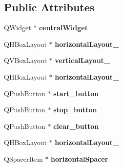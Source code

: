 \subsection*{Public Attributes}
\begin{DoxyCompactItemize}
\item 
Q\+Widget $\ast$ {\bfseries central\+Widget}\hypertarget{class_ui___main_window_a30075506c2116c3ed4ff25e07ae75f81}{}\label{class_ui___main_window_a30075506c2116c3ed4ff25e07ae75f81}

\item 
Q\+H\+Box\+Layout $\ast$ {\bfseries horizontal\+Layout\+\_}\hypertarget{class_ui___main_window_a2afb915e1492b7e6704db4918c1e5e80}{}\label{class_ui___main_window_a2afb915e1492b7e6704db4918c1e5e80}

\item 
Q\+V\+Box\+Layout $\ast$ {\bfseries vertical\+Layout\+\_}\hypertarget{class_ui___main_window_a38b8a4b887f3b58e2a49e7905ae6f1f0}{}\label{class_ui___main_window_a38b8a4b887f3b58e2a49e7905ae6f1f0}

\item 
Q\+H\+Box\+Layout $\ast$ {\bfseries horizontal\+Layout\+\_}\hypertarget{class_ui___main_window_a1351e317cba7ca711b6b4d2212b6bf36}{}\label{class_ui___main_window_a1351e317cba7ca711b6b4d2212b6bf36}

\item 
Q\+Push\+Button $\ast$ {\bfseries start\+\_\+button}\hypertarget{class_ui___main_window_ab235f64cecf6236a0d75504ef872a51d}{}\label{class_ui___main_window_ab235f64cecf6236a0d75504ef872a51d}

\item 
Q\+Push\+Button $\ast$ {\bfseries stop\+\_\+button}\hypertarget{class_ui___main_window_ab97437df31797bd0cea01f256e0b9617}{}\label{class_ui___main_window_ab97437df31797bd0cea01f256e0b9617}

\item 
Q\+Push\+Button $\ast$ {\bfseries clear\+\_\+button}\hypertarget{class_ui___main_window_a7b831e83c7c838d57c4c28e8d3fe7578}{}\label{class_ui___main_window_a7b831e83c7c838d57c4c28e8d3fe7578}

\item 
Q\+H\+Box\+Layout $\ast$ {\bfseries horizontal\+Layout\+\_}\hypertarget{class_ui___main_window_a14c9d4842c3e97e16e7873ef0aecdb1e}{}\label{class_ui___main_window_a14c9d4842c3e97e16e7873ef0aecdb1e}

\item 
Q\+Spacer\+Item $\ast$ {\bfseries horizontal\+Spacer}\hypertarget{class_ui___main_window_a7871ea8c4b6c595d7ccd53960b344719}{}\label{class_ui___main_window_a7871ea8c4b6c595d7ccd53960b344719}


\end{DoxyCompactItemize}
